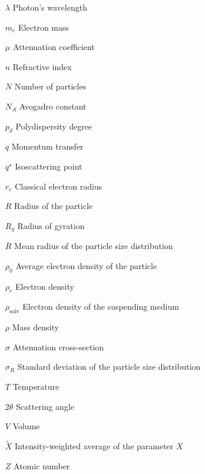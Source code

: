 \begin{itemize}
        \item[$\lambda$] Photon's wavelength  
        \item[$m_e$] Electron mass
        \item[$\mu$] Attenuation coefficient
        \item[$n$] Refractive index        
        \item[$N$] Number of particles
        \item[$N_A$] Avogadro constant
        \item[$p_d$] Polydispersity degree
        \item[$q$] Momentum transfer 
        \item[$q^{\star}$] Isoscattering point
        \item[$r_e$] Classical electron radius          
        \item[$R$] Radius of the particle 
        \item[$R_g$] Radius of gyration 
        \item[$\overline{R}$] Mean radius of the particle size distribution
        \item[$\rho_0$] Average electron density of the particle
        \item[$\rho_e$] Electron density
        \item[$\rho_{\text{solv}}$] Electron density of the suspending medium
        \item[$\rho$] Mass density
        \item[$\sigma$] Attenuation cross-section
        \item[$\sigma_R$] Standard deviation of the particle size distribution
        \item[$T$] Temperature  
        \item[2$\theta$] Scattering angle
        \item[$V$] Volume
        \item[$\tilde X$] Intensity-weighted average of the parameter $X$
        \item[$Z$] Atomic number

\end{itemize}

\cleardoublepage
